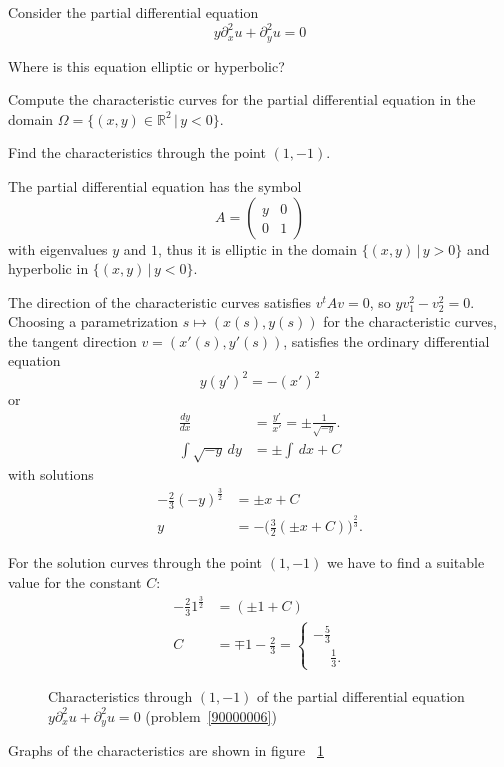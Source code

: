 Consider the partial differential equation
\[
y\partial_x^2u+\partial_y^2u=0
\]
\begin{teilaufgaben}
\item
Where is this equation elliptic or hyperbolic?
\item
Compute the characteristic curves for the partial differential equation
in the domain $\Omega=\{(x,y)\in\mathbb R^2\,|\,y<0\}$.
\item
Find the characteristics through the point $(1,-1)$.
\end{teilaufgaben}

\begin{loesung}
\begin{teilaufgaben}
\item
The partial differential equation has the symbol
\[
A=\begin{pmatrix}y&0\\0&1\end{pmatrix}
\]
with eigenvalues
$y$ and $1$,
thus it is elliptic in the domain
$\{(x,y)\,|\,y>0\}$
and hyperbolic in $\{(x,y)\,|\,y<0\}$.

\item
The direction of the characteristic curves satisfies
$v^tAv=0$, so $yv_1^2-v_2^2=0$.
Choosing a parametrization 
$s\mapsto(x(s),y(s))$ for the characteristic curves, the tangent
direction
$v=(x'(s),y'(s))$,
satisfies the ordinary differential equation
\[
y(y')^2=-(x')^2
\]
or
\begin{align*}
\frac{dy}{dx}&=\frac{y'}{x'}=\pm\frac1{\sqrt{-y}}.
\\
\int\sqrt{-y}\,dy&=\pm\int \,dx+C
\end{align*}
with solutions
\begin{align*}
-\frac23(-y)^{\frac32}&=\pm x+C
\\
y&=-\biggl(\frac32(\pm x+C)\biggr)^{\frac23}.
\end{align*}
\item
For the solution curves through the point $(1,-1)$
we have to find a suitable value for the constant $C$:
\begin{align*}
-\frac231^{\frac32}&=(\pm1+C)\\
C&=\mp 1-\frac23
=\begin{cases}
-\frac53\\
\phantom{-}\frac13.
\end{cases}
\end{align*}
\begin{figure}
\begin{center}
\end{center}
\caption{Characteristics through $(1,-1)$ of the partial differential equation
$y\partial_x^2u+\partial_y^2u=0$ (problem~\ref{90000006})
\label{90000006:char}}
\end{figure}
Graphs of the characteristics are shown in figure~ \ref{90000006:char}
\qedhere
\end{teilaufgaben}
\end{loesung}
